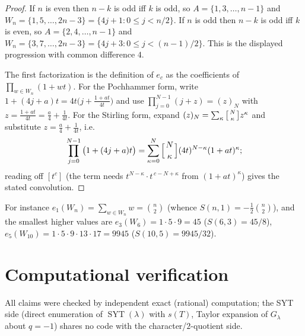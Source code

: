 \documentclass[11pt]{article}
\theoremstyle{definition}
\DeclareMathOperator{\SYT}{SYT}
\newcommand{\la}{\lambda}
\begin{document}
\begin{proof}
If $n$ is even then $n-k$ is odd iff $k$ is odd, so $A=\{1,3,\dots,n-1\}$ and
$W_n=\{1,5,\dots,2n-3\}=\{4j+1:0\le j<n/2\}$. If $n$ is odd then $n-k$ is odd iff
$k$ is even, so $A=\{2,4,\dots,n-1\}$ and
$W_n=\{3,7,\dots,2n-3\}=\{4j+3:0\le j<(n-1)/2\}$. This is the displayed
progression with common difference $4$.

The first factorization is the definition of $e_c$ as the coefficients of
$\prod_{w\in W_n}(1+wt)$. For the Pochhammer form, write
$1+(4j+a)t=4t\big(j+\tfrac{1+at}{4t}\big)$ and use
$\prod_{j=0}^{N-1}(j+z)=(z)_N$ with $z=\tfrac{1+at}{4t}=\tfrac{a}{4}+\tfrac1{4t}$.
For the Stirling form, expand $(z)_N=\sum_\kappa\big[{N\atop\kappa}\big]z^\kappa$
and substitute $z=\tfrac{a}{4}+\tfrac1{4t}$, i.e.
\[
  \prod_{j=0}^{N-1}\big(1+(4j+a)t\big)
   =\sum_{\kappa=0}^N\Big[{N\atop\kappa}\Big](4t)^{N-\kappa}(1+at)^{\kappa};
\]
reading off $[t^c]$ (the term needs $t^{N-\kappa}\cdot t^{\,c-N+\kappa}$ from
$(1+at)^\kappa$) gives the stated convolution.
\end{proof}

For instance $e_1(W_n)=\sum_{w\in W_n}w=\binom n2$ (whence
$S(n,1)=-\tfrac12\binom n2$), and the smallest higher values are
$e_3(W_6)=1\cdot5\cdot9=45$ ($S(6,3)=45/8$),
$e_5(W_{10})=1\cdot5\cdot9\cdot13\cdot17=9945$ ($S(10,5)=9945/32$).

\section{Computational verification}

All claims were checked by independent exact (rational) computation; the SYT side
(direct enumeration of $\SYT(\la)$ with $s(T)$, Taylor expansion of $G_\la$ about
$q=-1$) shares no code with the character/$2$-quotient side.
\end{document}
